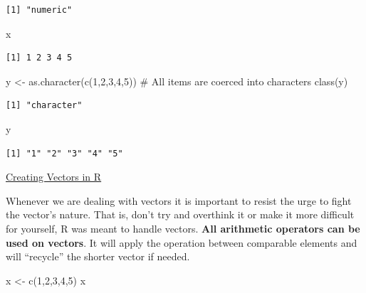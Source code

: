 \documentclass[
  letterpaper,
  DIV=11,
  numbers=noendperiod]{scrreprt}
\newenvironment{Shaded}{\begin{snugshade}}{\end{snugshade}}
\newcommand{\CommentTok}[1]{\textcolor[rgb]{0.37,0.37,0.37}{#1}}
\newcommand{\DecValTok}[1]{\textcolor[rgb]{0.68,0.00,0.00}{#1}}
\newcommand{\FunctionTok}[1]{\textcolor[rgb]{0.28,0.35,0.67}{#1}}
\newcommand{\NormalTok}[1]{\textcolor[rgb]{0.00,0.23,0.31}{#1}}
\newcommand{\OtherTok}[1]{\textcolor[rgb]{0.00,0.23,0.31}{#1}}
\begin{document}
\begin{verbatim}
[1] "numeric"
\end{verbatim}

\begin{Shaded}
\begin{Highlighting}[]
\NormalTok{x}
\end{Highlighting}
\end{Shaded}

\begin{verbatim}
[1] 1 2 3 4 5
\end{verbatim}

\begin{Shaded}
\begin{Highlighting}[]
\NormalTok{y }\OtherTok{\textless{}{-}} \FunctionTok{as.character}\NormalTok{(}\FunctionTok{c}\NormalTok{(}\DecValTok{1}\NormalTok{,}\DecValTok{2}\NormalTok{,}\DecValTok{3}\NormalTok{,}\DecValTok{4}\NormalTok{,}\DecValTok{5}\NormalTok{)) }\CommentTok{\# All items are coerced into characters}
\FunctionTok{class}\NormalTok{(y)}
\end{Highlighting}
\end{Shaded}

\begin{verbatim}
[1] "character"
\end{verbatim}

\begin{Shaded}
\begin{Highlighting}[]
\NormalTok{y}
\end{Highlighting}
\end{Shaded}

\begin{verbatim}
[1] "1" "2" "3" "4" "5"
\end{verbatim}

\begin{watch}{}{}
    \href{https://youtu.be/vhNnJbHhPzE}{Creating Vectors in R}
\end{watch}

Whenever we are dealing with vectors it is important to resist the urge
to fight the vector's nature. That is, don't try and overthink it or
make it more difficult for yourself, R was meant to handle vectors.
\textbf{All arithmetic operators can be used on vectors}. It will apply
the operation between comparable elements and will ``recycle'' the
shorter vector if needed.

\begin{Shaded}
\begin{Highlighting}[]
\NormalTok{x }\OtherTok{\textless{}{-}} \FunctionTok{c}\NormalTok{(}\DecValTok{1}\NormalTok{,}\DecValTok{2}\NormalTok{,}\DecValTok{3}\NormalTok{,}\DecValTok{4}\NormalTok{,}\DecValTok{5}\NormalTok{)}
\NormalTok{x}
\end{Highlighting}
\end{Shaded}
\end{document}
